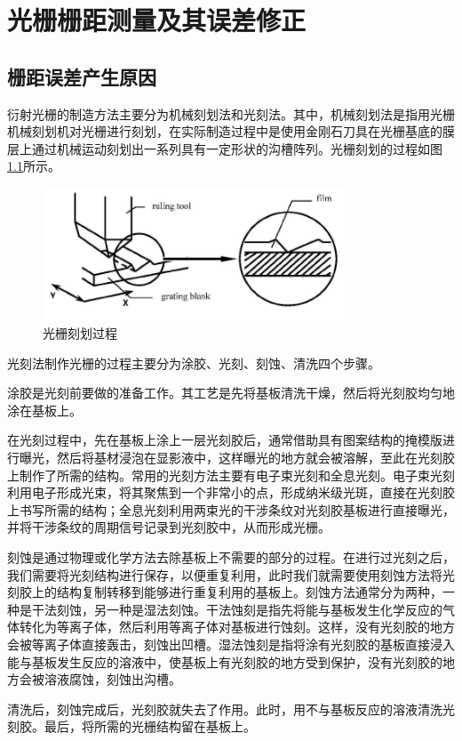 \documentclass[type=master,oneside]{fduthesis}
\begin{document}
\chapter{光栅栅距测量及其误差修正}
\section{栅距误差产生原因}
衍射光栅的制造方法主要分为机械刻划法和光刻法。其中，机械刻划法是指用光栅机械刻划机对光栅进行刻划，在实际制造过程中是使用金刚石刀具在光栅基底的膜层上通过机械运动刻划出一系列具有一定形状的沟槽阵列。光栅刻划的过程如图\ref{fig:光栅刻划过程}所示。
\begin{figure}[H]
  \centering
  \includegraphics[width=9cm]{5-fig//光栅刻划过程.png}
  \caption{光栅刻划过程}
  \label{fig:光栅刻划过程}
\end{figure}

光刻法制作光栅的过程主要分为涂胶、光刻、刻蚀、清洗四个步骤。

涂胶是光刻前要做的准备工作。其工艺是先将基板清洗干燥，然后将光刻胶均匀地涂在基板上。

在光刻过程中，先在基板上涂上一层光刻胶后，通常借助具有图案结构的掩模版进行曝光，然后将基材浸泡在显影液中，这样曝光的地方就会被溶解，至此在光刻胶上制作了所需的结构。常用的光刻方法主要有电子束光刻和全息光刻。电子束光刻利用电子形成光束，将其聚焦到一个非常小的点，形成纳米级光斑，直接在光刻胶上书写所需的结构；全息光刻利用两束光的干涉条纹对光刻胶基板进行直接曝光，并将干涉条纹的周期信号记录到光刻胶中，从而形成光栅。

刻蚀是通过物理或化学方法去除基板上不需要的部分的过程。在进行过光刻之后，我们需要将光刻结构进行保存，以便重复利用，此时我们就需要使用刻蚀方法将光刻胶上的结构复制转移到能够进行重复利用的基板上。刻蚀方法通常分为两种，一种是干法刻蚀，另一种是湿法刻蚀。干法蚀刻是指先将能与基板发生化学反应的气体转化为等离子体，然后利用等离子体对基板进行蚀刻。这样，没有光刻胶的地方会被等离子体直接轰击，刻蚀出凹槽。湿法蚀刻是指将涂有光刻胶的基板直接浸入能与基板发生反应的溶液中，使基板上有光刻胶的地方受到保护，没有光刻胶的地方会被溶液腐蚀，刻蚀出沟槽。

清洗后，刻蚀完成后，光刻胶就失去了作用。此时，用不与基板反应的溶液清洗光刻胶。最后，将所需的光栅结构留在基板上。
\end{document}
